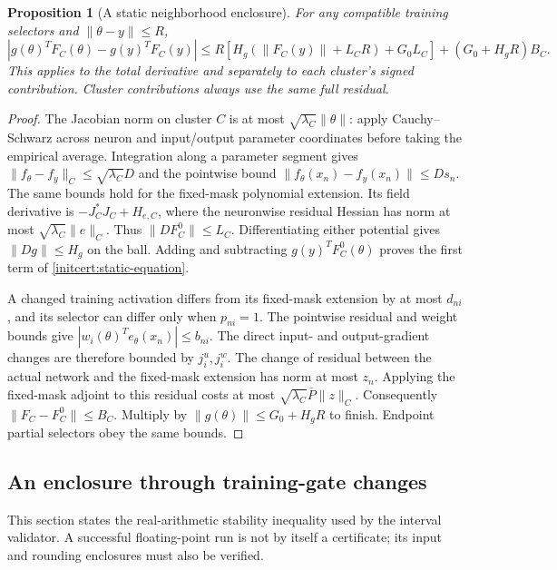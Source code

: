 \documentclass[10pt]{article}
\newtheorem{proposition}[theorem]{Proposition}
\begin{document}
\begin{proposition}[A static neighborhood enclosure]\label{initcert:static-bound}
For any compatible training selectors and $\|\theta-y\|\le R$,
\begin{equation}\label{initcert:static-equation}
 \left|g(\theta)^TF_C(\theta)-g(y)^TF_C(y)\right|
 \le R\left[H_g(\|F_C(y)\|+L_CR)+G_0L_C\right]
                   +(G_0+H_gR)B_C.
\end{equation}
This applies to the total derivative and separately to each cluster's
signed contribution. Cluster contributions always use the same full residual.
\end{proposition}
\begin{proof}
The Jacobian norm on cluster $C$ is at most
$\sqrt{\lambda_C}\|\theta\|$: apply Cauchy--Schwarz across neuron and
input/output parameter coordinates before taking the empirical average.
Integration along a parameter segment gives
$\|f_\theta-f_y\|_C\le\sqrt{\lambda_C}D$ and the pointwise bound
$\|f_\theta(x_n)-f_y(x_n)\|\le Ds_n$.
The same bounds hold for the fixed-mask polynomial extension.
Its field derivative is $-J_C^*J_C+H_{e,C}$, where the neuronwise
residual Hessian has norm at most
$\sqrt{\lambda_C}\|e\|_C$. Thus
$\|DF_C^0\|\le L_C$. Differentiating either potential gives
$\|Dg\|\le H_g$ on the ball. Adding and subtracting
$g(y)^TF_C^0(\theta)$ proves the first term of \eqref{initcert:static-equation}.

A changed training activation differs from its fixed-mask extension by at
most $d_{ni}$, and its selector can differ only when $p_{ni}=1$.
The pointwise residual and weight bounds give
$|w_i(\theta)^Te_\theta(x_n)|\le b_{ni}$. The direct input- and
output-gradient changes are therefore bounded by $j_i^u,j_i^w$.
The change of residual between the actual network and the fixed-mask
extension has norm at most $z_n$. Applying the fixed-mask adjoint to
this residual costs at most $\sqrt{\lambda_C}\bar P\|z\|_C$.
Consequently $\|F_C-F_C^0\|\le B_C$. Multiply by
$\|g(\theta)\|\le G_0+H_gR$ to finish. Endpoint partial selectors obey
the same bounds.
\end{proof}


\subsection{An enclosure through training-gate changes}
This section states the real-arithmetic stability inequality used by the
interval validator. A successful floating-point run is not by
itself a certificate; its input and rounding enclosures must also be verified.
\end{document}
